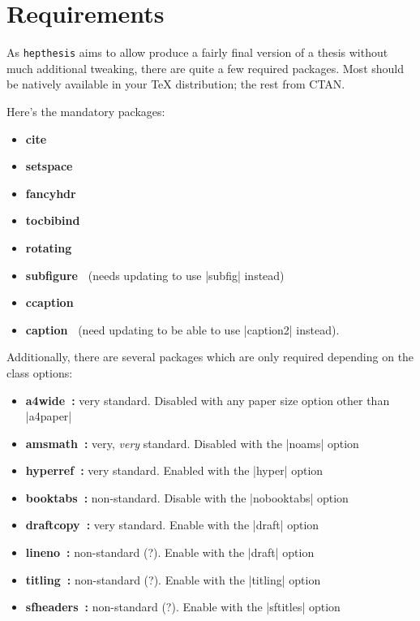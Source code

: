 \documentclass[12pt]{article}
\newcommand{\hepthesis}{\texttt{hepthesis}\xspace}
\let\OldCite\cite
\renewcommand{\cite}[1]{\mbox{\!\!\OldCite{#1}}}
\begin{document}
\section{Requirements}
As \hepthesis aims to allow produce a fairly final version of a thesis without
much additional tweaking, there are quite a few required packages. Most should
be natively available in your \TeX{} distribution; the rest from CTAN.

Here's the mandatory packages:
\begin{itemize}
\item \textbf{cite~\cite{cite}}
\item \textbf{setspace~\cite{setspace}}
\item \textbf{fancyhdr~\cite{fancyhdr}}
\item \textbf{tocbibind~\cite{tocbibind}}
\item \textbf{rotating~\cite{rotating}}
\item \textbf{subfigure~\cite{subfigure}} (needs updating to use |subfig| instead)
\item \textbf{ccaption~\cite{ccaption}}
\item \textbf{caption~\cite{caption}} (need updating to be able to use |caption2| instead).
\end{itemize}

Additionally, there are several packages which are only required depending on
the class options:

\begin{itemize}
\item \textbf{a4wide~\cite{a4wide}:} very standard. Disabled with any paper size option other than |a4paper|
\item \textbf{amsmath~\cite{amsmath}:} very, \emph{very} standard. Disabled with the |noams| option
\item \textbf{hyperref~\cite{hyperref}:} very standard. Enabled with the |hyper| option
\item \textbf{booktabs~\cite{booktabs}:} non-standard. Disable with the |nobooktabs| option
\item \textbf{draftcopy~\cite{draftcopy}:} very standard. Enable with the |draft| option
\item \textbf{lineno~\cite{lineno}:} non-standard (?). Enable with the |draft| option
\item \textbf{titling~\cite{titling}:} non-standard (?). Enable with the |titling| option
\item \textbf{sfheaders~\cite{sfheaders}:} non-standard (?). Enable with the |sftitles| option
\end{itemize}
\end{document}
